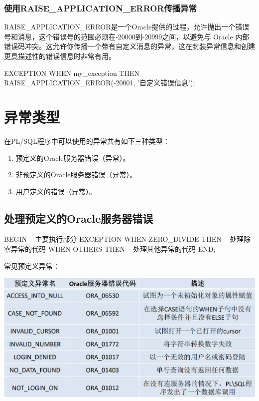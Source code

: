 \documentclass[11pt, a4paper, oneside, UTF8]{ctexbook}
\begin{document}
\subsubsection{使用RAISE\_APPLICATION\_ERROR传播异常}
RAISE\_APPLICATION\_ERROR是一个Oracle提供的过程，允许抛出一个错误号和消息，这个错误号的范围必须在-20000到-20999之间，以避免与 Oracle 内部错误码冲突。这允许你传播一个带有自定义消息的异常，这在封装异常信息和创建更具描述性的错误信息时非常有用。
\begin{plsql}[caption=RAISE\_APPLICATION\_ERROR传播异常示例代码]
EXCEPTION
  WHEN my_exception THEN
  RAISE_APPLICATION_ERROR(-20001, '自定义错误信息');
\end{plsql}
\section{异常类型}
在PL/SQL程序中可以使用的异常共有如下三种类型：
\begin{enumerate}
  \item 预定义的Oracle服务器错误（异常）。
  \item 非预定义的Oracle服务器错误（异常）。
  \item 用户定义的错误（异常）。
\end{enumerate}
\subsection{处理预定义的Oracle服务器错误}

\begin{plsql}[caption=处理预定义的Oracle服务器错误示例]
BEGIN
  -- 主要执行部分
EXCEPTION
  WHEN ZERO_DIVIDE THEN
  -- 处理除零异常的代码
  WHEN OTHERS THEN
  -- 处理其他异常的代码
END;
\end{plsql}
常见预定义异常：
\begin{center}
  \begin{minipage}{\textwidth}
    \center
    \includegraphics[width=1\textwidth]{picture/常见预定义异常.png}
    \captionsetup{hypcap=false}
    \label{fig:常见预定义异常}
  \end{minipage}
\end{center}
\end{document}

